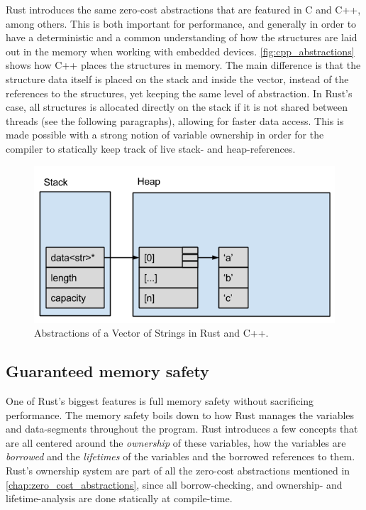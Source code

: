 Rust introduces the same zero-cost abstractions that are featured in C and C++, among others.
This is both important for performance, and generally in order to have a deterministic and a common understanding of how the structures are laid out in the memory when working with embedded devices.
\autoref{fig:cpp_abstractions} shows how C++ places the structures in memory.
The main difference is that the structure data itself is placed on the stack and inside the vector, instead of the references to the structures, yet keeping the same level of abstraction.
In Rust's case, all structures is allocated directly on the stack if it is not shared between threads (see the following paragraphs), allowing for faster data access.
This is made possible with a strong notion of variable ownership in order for the compiler to statically keep track of live stack- and heap-references.

\begin{figure}[tb]
  \begin{center}
    \includegraphics[scale=0.5]{figures/cpp_abstractions}
  \end{center}
  \caption{Abstractions of a Vector of Strings in Rust and C++.}
  \label{fig:cpp_abstractions}
\end{figure}

\subsection{Guaranteed memory safety}

One of Rust's biggest features is full memory safety \cite{web:rust_book_unsafe} without sacrificing performance.
The memory safety boils down to how Rust manages the variables and data-segments throughout the program.
Rust introduces a few concepts that are all centered around the \emph{ownership} of these variables, how the variables are \emph{borrowed} and the \emph{lifetimes} of the variables and the borrowed references to them.
Rust's ownership system are part of all the zero-cost abstractions mentioned in \autoref{chap:zero_cost_abstractions}, since all borrow-checking, and ownership- and lifetime-analysis are done statically at compile-time.

